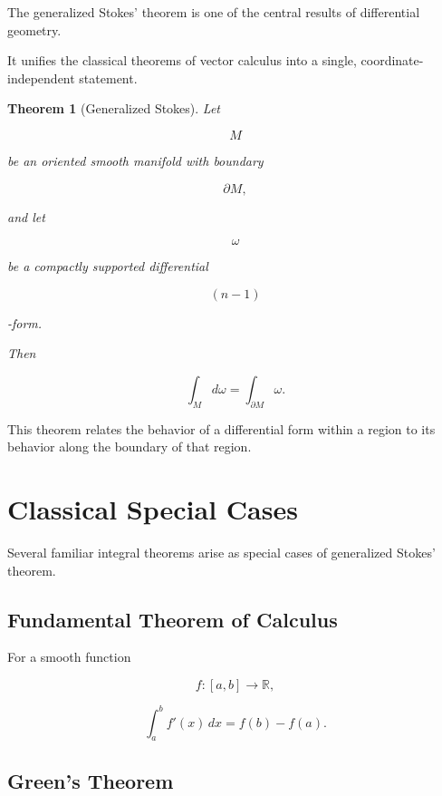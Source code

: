 \documentclass[11pt,fleqn]{book}
\numberwithin{equation}{chapter}
\theoremstyle{plain}
\newtheorem{theorem}{Theorem}[chapter]
\theoremstyle{definition}
\theoremstyle{remark}
\begin{document}
The generalized Stokes' theorem is one of the central results of
differential geometry.

It unifies the classical theorems of vector calculus into a single,
coordinate-independent statement.


\begin{theorem}[Generalized Stokes]

Let

\[
M
\]

be an oriented smooth manifold with boundary

\[
\partial M,
\]

and let

\[
\omega
\]

be a compactly supported differential

\[
(n-1)
\]

-form.

Then

\[
\boxed{
\int_M d\omega
=
\int_{\partial M}\omega.
}
\]

\end{theorem}

This theorem relates the behavior of a differential form within a
region to its behavior along the boundary of that region.


\section{Classical Special Cases}

Several familiar integral theorems arise as special cases of
generalized Stokes' theorem.

\subsection{Fundamental Theorem of Calculus}

For a smooth function

\[
f:[a,b]\rightarrow\mathbb R,
\]

\[
\boxed{
\int_a^b
f'(x)\,dx
=
f(b)-f(a).
}
\]


\subsection{Green's Theorem}
\end{document}
